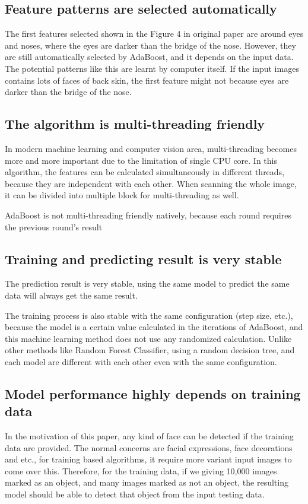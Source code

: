 \documentclass[10pt,twocolumn,letterpaper]{article}
\begin{document}
\subsection{Feature patterns are selected automatically}
The first features selected shown in the Figure 4 in original paper are around eyes and noses, where the eyes are darker than the bridge of the nose.
However, they are still automatically selected by AdaBoost, and it depends on the input data. The potential patterns like this are learnt by computer itself.
If the input images contains lots of faces of back skin, the first feature might not because eyes are darker than the bridge of the nose.

\subsection{The algorithm is multi-threading friendly}
In modern machine learning and computer vision area, multi-threading becomes more and more important due to the limitation of single CPU core.
In this algorithm, the features can be calculated simultaneously in different threads, because they are independent with each other.
When scanning the whole image, it can be divided into multiple block for multi-threading as well.

AdaBoost is not multi-threading friendly natively, because each round requires the previous round's result

\subsection{Training and predicting result is very stable}
The prediction result is very stable, using the same model to predict the same data will always get the same result.

The training process is also stable with the same configuration (step size, etc.),
because the model is a certain value calculated in the iterations of AdaBoost,
and this machine learning method does not use any randomized calculation.
Unlike other methods like Random Forest Classifier, using a random decision tree,
and each model are different with each other even with the same configuration.

\subsection{Model performance highly depends on training data}
In the motivation of this paper, any kind of face can be detected if the training data are provided.
The normal concerns are facial expressions, face decorations and etc., for training based algorithms, it require more variant input images to come over this.
Therefore, for the training data, if we giving 10,000 images marked as an object, and many images marked as not an object,
the resulting model should be able to detect that object from the input testing data.
\end{document}
